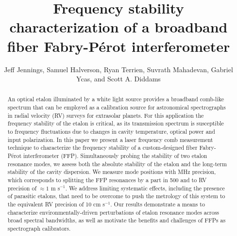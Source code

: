 \documentclass[10pt]{article}
\newcommand{\ms}{{m s$^{-1}$}}
\newcommand{\fabper}{Fabry-P{\'e}rot}
\begin{document}
\title{Frequency stability characterization of a broadband fiber {\fabper} interferometer}

\author{Jeff Jennings, Samuel Halverson, Ryan Terrien, Suvrath Mahadevan, Gabriel Ycas, and Scott A. Diddams}

\address{National Institute of Standards and Technology, Boulder, CO 80305, USA\\
Department of Physics, University of Colorado, Boulder, CO 80309, USA\\
Department of Astronomy \& Astrophysics, The Pennsylvania State University, 525 Davey Lab, University Park, PA 16802, USA\\
Penn State Astrobiology Research Center, University Park, PA 16802, USA\\
Center for Exoplanets \& Habitable Worlds, University Park, PA 16802, USA\\
Department of Physics and Astronomy, University of Pennsylvania, Philadelphia, PA 19104, USA \\
NASA Sagan Fellow\\
jeffrey.m.jennings@colorado.edu\\
scott.diddams@nist.gov}
    
\begin{abstract}
An optical etalon illuminated by a white light source provides a broadband comb-like spectrum that can be employed as a calibration source for astronomical spectrographs in radial velocity (RV) surveys for extrasolar planets.  For this application the frequency stability of the etalon is critical, as its transmission spectrum is susceptible to frequency fluctuations due to changes in cavity temperature, optical power and input polarization.  In this paper we present a laser frequency comb measurement technique to characterize the frequency stability of a custom-designed fiber {\fabper} interferometer (FFP). Simultaneously probing the stability of two etalon resonance modes, we assess both the absolute stability of the etalon and the long-term stability of the cavity dispersion. We measure mode positions with MHz precision, which corresponds to splitting the FFP resonances by a part in 500 and to RV precision of $\approx 1$ {\ms}. We address limiting systematic effects, including the presence of parasitic etalons, that need to be overcome to push the metrology of this system to the equivalent RV precision of 10 c{\ms}. Our results demonstrate a means to characterize environmentally-driven perturbations of etalon resonance modes across broad spectral bandwidths, as well as motivate the benefits and challenges of FFPs as spectrograph calibrators.
\end{abstract}
\end{document}
